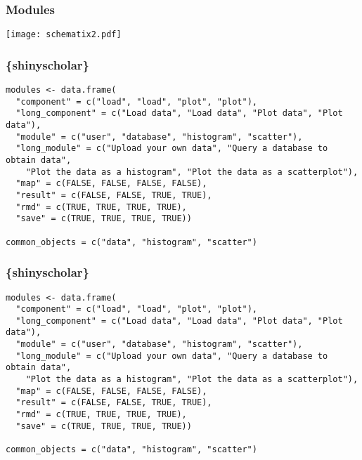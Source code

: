 \documentclass[handout, aspectratio = 169, xcolor={dvipsnames}]{beamer}
\begin{document}
\begin{frame}
\frametitle{Modules}
\texttt{[image: schematix2.pdf]}
\end{frame} 



\begin{frame}[fragile]
\frametitle{\{shinyscholar\}}
\footnotesize{
\vspace{1mm}
\begin{Verbatim}
modules <- data.frame(
  "component" = c("load", "load", "plot", "plot"),
  "long_component" = c("Load data", "Load data", "Plot data", "Plot data"),
  "module" = c("user", "database", "histogram", "scatter"),
  "long_module" = c("Upload your own data", "Query a database to obtain data",
    "Plot the data as a histogram", "Plot the data as a scatterplot"),
  "map" = c(FALSE, FALSE, FALSE, FALSE),
  "result" = c(FALSE, FALSE, TRUE, TRUE),
  "rmd" = c(TRUE, TRUE, TRUE, TRUE),
  "save" = c(TRUE, TRUE, TRUE, TRUE))

common_objects = c("data", "histogram", "scatter")

\end{Verbatim}
}
\end{frame} 




\begin{frame}[fragile]
\frametitle{\{shinyscholar\}}
\footnotesize{
\vspace{1mm}



\renewcommand{\FancyVerbFormatLine}[1]{%
   \ifnum\value{FancyVerbLine}=2\color{cyan}#1%
   \else #1\fi}

\begin{Verbatim}
modules <- data.frame(
  "component" = c("load", "load", "plot", "plot"),
  "long_component" = c("Load data", "Load data", "Plot data", "Plot data"),
  "module" = c("user", "database", "histogram", "scatter"),
  "long_module" = c("Upload your own data", "Query a database to obtain data",
    "Plot the data as a histogram", "Plot the data as a scatterplot"),
  "map" = c(FALSE, FALSE, FALSE, FALSE),
  "result" = c(FALSE, FALSE, TRUE, TRUE),
  "rmd" = c(TRUE, TRUE, TRUE, TRUE),
  "save" = c(TRUE, TRUE, TRUE, TRUE))

common_objects = c("data", "histogram", "scatter")

\end{Verbatim}
}
\end{frame} 
\end{document}
